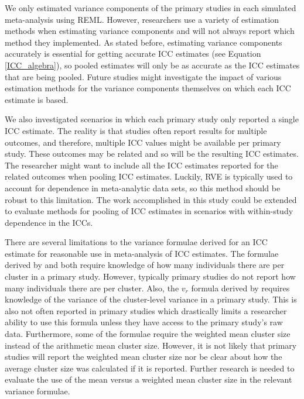 
We only estimated variance components of the primary studies in each simulated meta-analysis using REML. However, researchers use a variety of estimation methods when estimating variance components and will not always report which method they implemented. As stated before, estimating variance components accurately is essential for getting accurate ICC estimates (see Equation \ref{ICC_algebra}), so pooled estimates will only be as accurate as the ICC estimates that are being pooled. Future studies might investigate the impact of various estimation methods for the variance components themselves on which each ICC estimate is based. 
    
We also investigated scenarios in which each primary study only reported a single ICC estimate. The reality is that studies often report results for multiple outcomes, and therefore, multiple ICC values might be available per primary study. These outcomes may be related and so will be the resulting ICC estimates. The researcher might want to include all the ICC estimates reported for the related outcomes when pooling ICC estimates. Luckily, RVE is typically used to account for dependence in meta-analytic data sets, so this method should be robust to this limitation. The work accomplished in this study could be extended to evaluate methods for pooling of ICC estimates in scenarios with within-study dependence in the ICCs.  

There are several limitations to the variance formulae derived for an ICC estimate for reasonable use in meta-analysis of ICC estimates. The formulae derived by  and  both require knowledge of how many individuals there are per cluster in a primary study. However, typically primary studies do not report how many individuals there are per cluster.  Also, the $v_r$ formula derived by  requires knowledge of the variance of the cluster-level variance in a primary study. This is also not often reported in primary studies which drastically limits a researcher ability to use this formula unless they have access to the primary study's raw data. Furthermore, some of the formulae require the weighted mean cluster size \cite{smith1957, swiger1964} instead of the arithmetic mean cluster size. However, it is not likely that primary studies will report the weighted mean cluster size nor be clear about how the average cluster size was calculated if it is reported. Further research is needed to evaluate the use of the mean versus a weighted mean cluster size in the relevant variance formulae. 

